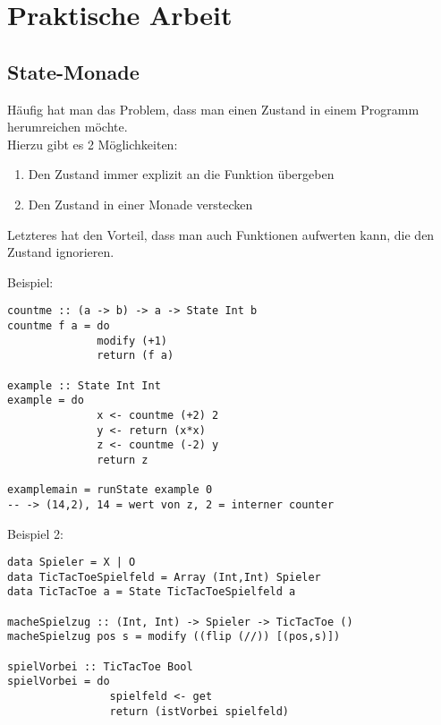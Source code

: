 \documentclass{beamer}
\begin{document}
\section{Praktische Arbeit}

\subsection{State-Monade}
\begin{frame}[fragile]
Häufig hat man das Problem, dass man einen Zustand in einem Programm herumreichen möchte.\\
\pause
Hierzu gibt es 2 Möglichkeiten:
\begin{enumerate}
 \item Den Zustand immer explizit an die Funktion übergeben
 \item Den Zustand in einer Monade verstecken
\end{enumerate}
\pause
Letzteres hat den Vorteil, dass man auch Funktionen aufwerten kann, die den Zustand ignorieren.
\end{frame}

\begin{frame}[fragile]
Beispiel:
\begin{verbatim}
countme :: (a -> b) -> a -> State Int b
countme f a = do
              modify (+1)
              return (f a)

example :: State Int Int
example = do
              x <- countme (+2) 2
              y <- return (x*x)
              z <- countme (-2) y
              return z

examplemain = runState example 0
-- -> (14,2), 14 = wert von z, 2 = interner counter
\end{verbatim}
\end{frame}

\begin{frame}[fragile]
Beispiel 2:
\begin{verbatim}
data Spieler = X | O
data TicTacToeSpielfeld = Array (Int,Int) Spieler
data TicTacToe a = State TicTacToeSpielfeld a

macheSpielzug :: (Int, Int) -> Spieler -> TicTacToe ()
macheSpielzug pos s = modify ((flip (//)) [(pos,s)])

spielVorbei :: TicTacToe Bool
spielVorbei = do
                spielfeld <- get
                return (istVorbei spielfeld)
\end{verbatim}
\end{frame}
\end{document}
